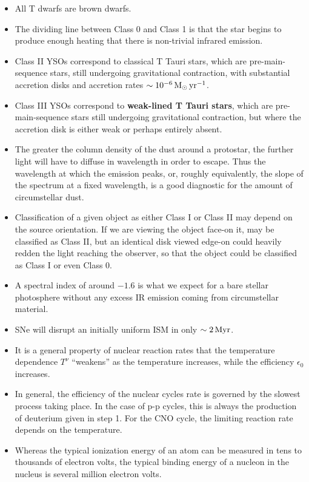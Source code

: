 \documentclass[a4paper,10pt]{article}
\begin{document}
\begin{itemize}
    \item All T dwarfs are brown dwarfs.
    \item The dividing line between Class 0 and Class 1 is that the star begins to produce enough heating that there is non-trivial infrared emission.
    \item Class II YSOs correspond to classical T Tauri stars, which are pre-main-sequence stars, still undergoing gravitational contraction, with substantial accretion disks and accretion rates $\sim10^{-6}\,{\rm M_\odot\,yr^{-1}}$.
    \item Class III YSOs correspond to \textbf{weak-lined T Tauri stars}, which are pre-main-sequence stars still undergoing gravitational contraction, but where the accretion disk is either weak or perhaps entirely absent.
    \item The greater the column density of the dust around a protostar, the further light will have to diffuse in wavelength in order to escape. Thus the wavelength at which the emission peaks, or, roughly equivalently, the slope of the spectrum at a fixed wavelength, is a good diagnostic for the amount of circumstellar dust.
    \item Classification of a given object as either Class I or Class II may depend on the source orientation. If we are viewing the object face-on it, may be classified as Class II, but an identical disk viewed edge-on could heavily redden the light reaching the observer, so that the object could be classified as Class I or even Class 0.
    \item A spectral index of around $-1.6$ is what we expect for a bare stellar photosphere without any excess IR emission coming from circumstellar material.
    \item SNe will disrupt an initially uniform ISM in only $\sim2\,{\rm Myr}$.
    \item It is a general property of nuclear reaction rates that the temperature dependence $T^\nu$ ``weakens'' as the temperature increases, while the efficiency $\epsilon_0$ increases.
    \item In general, the efficiency of the nuclear cycles rate is governed by the slowest process taking place. In the case of p-p cycles, this is always the production of deuterium given in step 1. For the CNO cycle, the limiting reaction rate depends on the temperature.
    \item Whereas the typical ionization energy of an atom can be measured in tens to thousands of electron volts, the typical binding energy of a nucleon in the nucleus is several million electron volts.

\end{itemize}
\end{document}
